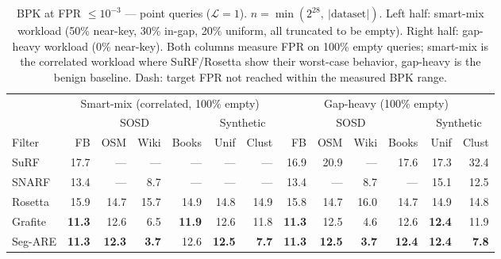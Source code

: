 \begin{table}[H]
    \centering
    \footnotesize
    \setlength{\tabcolsep}{4pt}
    \begin{tabular}{@{}lrrrrrr|rrrrrr@{}}
        \toprule
        & \multicolumn{6}{c|}{Smart-mix (correlated, 100\% empty)} & \multicolumn{6}{c}{Gap-heavy (100\% empty)} \\
        \cmidrule(lr){2-7} \cmidrule(lr){8-13}
        & \multicolumn{4}{c}{SOSD} & \multicolumn{2}{c|}{Synthetic} & \multicolumn{4}{c}{SOSD} & \multicolumn{2}{c}{Synthetic} \\
        \cmidrule(lr){2-5} \cmidrule(lr){6-7} \cmidrule(lr){8-11} \cmidrule(lr){12-13}
        Filter & FB & OSM & Wiki & Books & Unif & Clust & FB & OSM & Wiki & Books & Unif & Clust \\
        \midrule
        SuRF    & 17.7          & \textnormal{---} & \textnormal{---} & \textnormal{---} & \textnormal{---} & \textnormal{---} & 16.9          & 20.9          & \textnormal{---} & 17.6          & 17.3          & 32.4 \\
        SNARF   & 13.4          & \textnormal{---} & 8.7           & \textnormal{---} & \textnormal{---} & \textnormal{---} & 13.4          & \textnormal{---} & 8.7           & \textnormal{---} & 15.1          & 12.5 \\
        Rosetta & 15.9          & 14.7          & 15.7          & 14.9          & 14.8          & 14.9          & 15.8          & 14.7          & 16.0          & 14.7          & 14.9          & 14.8 \\
        Grafite & \textbf{11.3} & 12.6          & 6.5           & \textbf{11.9} & 12.6          & 11.8          & \textbf{11.3} & 12.5          & 4.6           & 12.6          & \textbf{12.4} & 11.9 \\
        Seg-ARE & \textbf{11.3} & \textbf{12.3} & \textbf{3.7}  & 12.6          & \textbf{12.5} & \textbf{7.7}  & \textbf{11.3} & \textbf{12.5} & \textbf{3.7}  & \textbf{12.4} & \textbf{12.4} & \textbf{7.8} \\
        \bottomrule
    \end{tabular}
    \caption{BPK at FPR $\leq 10^{-3}$ --- point queries ($\mathcal{L}=1$).
             $n = \min(2^{28},\ |\text{dataset}|)$.
             Left half: smart-mix workload (50\% near-key, 30\% in-gap,
             20\% uniform, all truncated to be empty). Right half:
             gap-heavy workload (0\% near-key). Both columns measure
             FPR on 100\% empty queries; smart-mix is the correlated
             workload where SuRF/Rosetta show their worst-case
             behavior, gap-heavy is the benign baseline.
             Dash: target FPR not reached within the measured BPK range.}
    \label{tab:bpk-L1}
\end{table}

